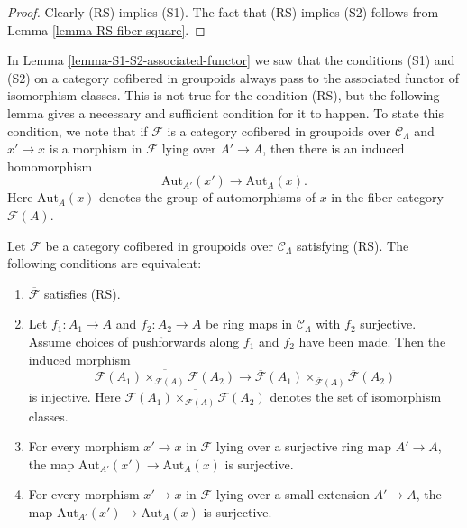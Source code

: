 \begin{proof}
Clearly (RS) implies (S1).  The fact that (RS) implies (S2) follows from Lemma 
\ref{lemma-RS-fiber-square}.
\end{proof}

\noindent
In Lemma \ref{lemma-S1-S2-associated-functor} we saw that the conditions (S1) 
and (S2) on a category cofibered in groupoids always pass to the associated 
functor of isomorphism classes. This is not true for the condition (RS), but 
the following lemma gives a necessary and sufficient condition for it to 
happen.  To state this condition, we note that if $\mathcal{F}$ is a category 
cofibered in groupoids over $\mathcal{C}_\Lambda$ and $x' \to x$ is a 
morphism in $\mathcal{F}$ lying over $A' \to A$, then there is an 
induced homomorphism
\[ \text{Aut}_{A'}(x') \to \text{Aut}_{A}(x). \]
Here $\text{Aut}_{A}(x)$ denotes the group of automorphisms of $x$ in the 
fiber category $\mathcal{F}(A)$.

\begin{lemma}
\label{lemma-RS-associated-functor}
Let $\mathcal{F}$ be a category cofibered in groupoids over $\mathcal 
C_\Lambda$ satisfying (RS).  The following conditions are 
equivalent: 
\begin{enumerate}
\item $\overline{\mathcal{F}}$ satisfies (RS).
\item Let $f_1: A_1 \to A$ and $f_2: A_2 \to A$ be ring maps in 
$\mathcal{C}_\Lambda$ with $f_2$ surjective. Assume choices of pushforwards 
along $f_1$ and $f_2$ have been made.  Then the induced morphism
\[
\overline{\mathcal{F}(A_1) \times_{\mathcal{F}(A)} \mathcal{F}(A_2)}
\to \overline{\mathcal{F}}(A_1) \times_{\overline{\mathcal{F}}(A)} 
\overline{\mathcal{F}}(A_2)
\]
is injective.  Here $ \overline{\mathcal{F}(A_1) \times_{\mathcal{F}(A)} \mathcal 
F(A_2)}$ denotes the set of isomorphism classes.
\item For every morphism $x' \to x$ in $\mathcal{F}$ lying over a 
surjective ring map $A' \to A$, the map $\text{Aut}_{A'}(x') 
\to \text{Aut}_{A}(x)$ is surjective.
\item For every morphism $x' \to x$ in $\mathcal{F}$ lying over a small 
extension $A' \to A$, the map $\text{Aut}_{A'}(x') \to 
\text{Aut}_{A}(x)$ is surjective.
\end{enumerate}
\end{lemma}

